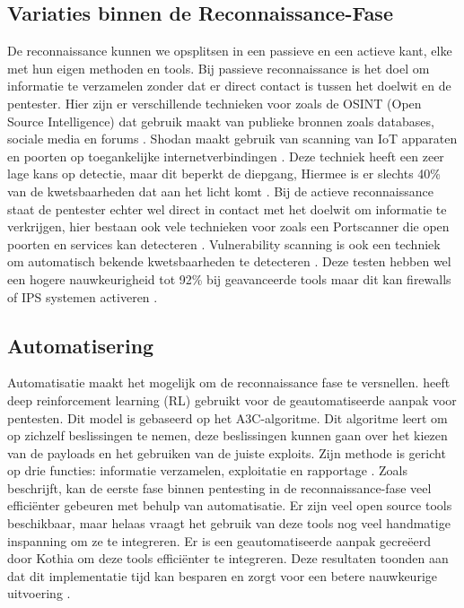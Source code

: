\subsection{Variaties binnen de Reconnaissance-Fase}
De reconnaissance kunnen we opsplitsen in een passieve en een actieve kant, elke met hun eigen methoden en tools. 
Bij passieve reconnaissance is het doel om informatie te verzamelen zonder dat er direct contact is tussen het doelwit en de pentester.
Hier zijn er verschillende technieken voor zoals de OSINT (Open Source Intelligence) dat gebruik maakt van publieke bronnen zoals databases, sociale media en forums \autocite{Dalalana2017}. 
Shodan maakt gebruik van scanning van IoT apparaten en poorten op toegankelijke internetverbindingen \autocite{Monero2025}.
Deze techniek heeft een zeer lage kans op detectie, maar dit beperkt de diepgang, Hiermee is er slechts 40\% van de kwetsbaarheden dat aan het licht komt \parencite{Mahin2014}.
Bij de actieve reconnaissance staat de pentester echter wel direct in contact met het doelwit om informatie te verkrijgen, hier bestaan ook vele technieken voor zoals een Portscanner die open poorten en services kan detecteren \autocite{Monero2025}. 
Vulnerability scanning is ook een techniek om automatisch bekende kwetsbaarheden te detecteren \autocite{GOEL2015}. 
Deze testen hebben wel een hogere nauwkeurigheid tot 92\% bij geavanceerde tools maar dit kan firewalls of IPS systemen activeren \parencite{Li2022}.

\subsection{Automatisering}
Automatisatie maakt het mogelijk om de reconnaissance fase te versnellen. 
\textcite{Hoang2022} heeft deep reinforcement learning (RL) gebruikt voor de geautomatiseerde aanpak voor pentesten. 
Dit model is gebaseerd op het A3C-algoritme. Dit algoritme leert om op zichzelf beslissingen te nemen, deze beslissingen kunnen gaan over het kiezen van de payloads en het gebruiken van de juiste exploits. 
Zijn methode is gericht op drie functies: informatie verzamelen, exploitatie en rapportage \autocite{Hoang2022}.
Zoals \textcite{Kothia2019} beschrijft, kan de eerste fase binnen pentesting in de reconnaissance-fase veel efficiënter gebeuren met behulp van automatisatie. 
Er zijn veel open source tools beschikbaar, maar helaas vraagt het gebruik van deze tools nog veel handmatige inspanning om ze te integreren.
Er is een geautomatiseerde aanpak gecreëerd door Kothia om deze tools efficiënter te integreren. 
Deze resultaten toonden aan dat dit implementatie tijd kan besparen en zorgt voor een betere nauwkeurige uitvoering \parencite{Kothia2019}.

